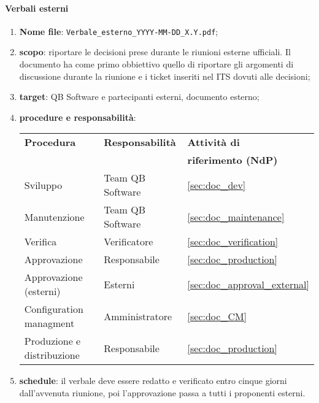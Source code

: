         \paragraph{Verbali esterni}
            \begin{enumerate}
                \item \textbf{Nome file}: \texttt{Verbale\_esterno\_YYYY-MM-DD\_X.Y.pdf};
                \item \textbf{scopo}: riportare le decisioni prese durante le riunioni esterne ufficiali. Il documento ha come primo obbiettivo quello di riportare gli argomenti di discussione durante la riunione e i ticket inseriti nel ITS dovuti alle decisioni;
                \item \textbf{target}: QB Software e partecipanti esterni, documento esterno;
                \item \textbf{procedure e responsabilità}:
                \\
                \begin{tabularx}{0.93\textwidth}{|X|X|X|}
                    \hline
                    \textbf{Procedura} & \textbf{Responsabilità} & \textbf{Attività di} \\
                    & & \textbf{riferimento (NdP)} \\
                    \hline
                    Sviluppo & Team QB Software &  \ref{sec:doc_dev}
                    \\\hline
                    Manutenzione & Team QB Software & \ref{sec:doc_maintenance}
                    \\\hline
                    Verifica & Verificatore & \ref{sec:doc_verification}
                    \\\hline
                    Approvazione & Responsabile & \ref{sec:doc_production}
                    \\\hline
                    Approvazione (esterni) & Esterni & \ref{sec:doc_approval_external}
                    \\\hline
                    Configuration managment & Amministratore & \ref{sec:doc_CM}
                    \\\hline
                    Produzione e distribuzione & Responsabile & \ref{sec:doc_production}
                    \\\hline
                \end{tabularx}
                \item \textbf{schedule}: il verbale deve essere redatto e verificato entro cinque giorni dall'avvenuta riunione, poi l'approvazione passa a tutti i proponenti esterni.
            \end{enumerate} 

